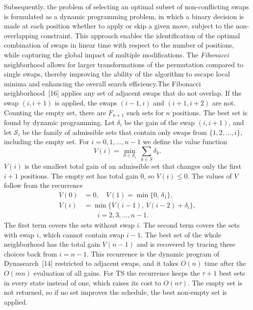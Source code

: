 \documentclass[12pt]{article}
\begin{document}
{Subsequently, the problem of selecting an optimal subset of non-conflicting swaps is formulated as a dynamic programming problem, in which a binary decision is made at each position whether to apply or skip a given move, subject to the non-overlapping constraint. This approach enables the identification of the optimal combination of swaps in linear time with respect to the number of positions, while capturing the global impact of multiple modifications. The \emph{Fibonacci} neighborhood allows for larger transformations of the permutation compared to single swaps, thereby improving the ability of the algorithm to escape local minima and enhancing the overall search efficiency.}{The Fibonacci neighborhood~[16] applies any set of adjacent swaps that do not overlap. If the swap $(i,i+1)$ is applied, the swaps $(i-1,i)$ and $(i+1,i+2)$ are not. Counting the empty set, there are $F_{n+1}$ such sets for $n$ positions. The best set is found by dynamic programming. Let $\delta_i$ be the gain of the swap $(i,i+1)$, and let $\mathcal{S}_i$ be the family of admissible sets that contain only swaps from $\{1,2,\dots,i\}$, including the empty set. For $i=0,1,\dots,n-1$ we define the value function
\begin{equation}
V(i)=\min_{S\in\mathcal{S}_i}\ \sum_{k\in S}\delta_k .
\end{equation}
$V(i)$ is the smallest total gain of an admissible set that changes only the first $i+1$ positions. The empty set has total gain $0$, so $V(i)\le 0$. The values of $V$ follow from the recurrence
\begin{align}
V(0)&=0, \quad V(1)=\min\{0,\,\delta_1\}, \\
V(i)&=\min\{V(i-1),\,V(i-2)+\delta_i\}, \nonumber\\
&\qquad i=2,3,\dots,n-1. 
\end{align}
The first term covers the sets without swap $i$. The second term covers the sets with swap $i$, which cannot contain swap $i-1$. The best set of the whole neighborhood has the total gain $V(n-1)$ and is recovered by tracing these choices back from $i=n-1$. This recurrence is the dynamic program of Dynasearch~[14] restricted to adjacent swaps, and it takes $O(n)$ time after the $O(mn)$ evaluation of all gains. For TS the recurrence keeps the $\tau+1$ best sets in every state instead of one, which raises its cost to $O(n\tau)$. The empty set is not returned, so if no set improves the schedule, the best non-empty set is applied.}
\end{document}

